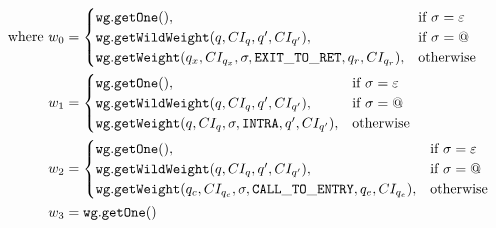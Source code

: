 \begin{align*}
\text{where }
w_0 & = \begin{cases}
        \mathtt{wg.getOne}(), & \text{if } \sigma = \varepsilon \\
        \mathtt{wg.getWildWeight}(q,CI_q,q',CI_{q'}), & \text{if } \sigma = \text{\ensuremath{@}} \\
        \mathtt{wg.getWeight}(q_x,CI_{q_x},\sigma,\mathtt{EXIT\_TO\_RET},q_r,CI_{q_r}), & \text{otherwise}
      \end{cases}  \\
w_1 &= \begin{cases}
         \mathtt{wg.getOne}(), & \text{if } \sigma = \varepsilon \\
         \mathtt{wg.getWildWeight}(q,CI_q,q',CI_{q'}), & \text{if } \sigma = \text{\ensuremath{@}} \\
         \mathtt{wg.getWeight}(q,CI_q,\sigma,\mathtt{INTRA},q',CI_{q'}), & \text{otherwise}
      \end{cases} \\
w_2 &= \begin{cases}
         \mathtt{wg.getOne}(), & \text{if } \sigma = \varepsilon \\
         \mathtt{wg.getWildWeight}(q,CI_q,q',CI_{q'}), & \text{if } \sigma = \text{\ensuremath{@}} \\
         \mathtt{wg.getWeight}(q_c,CI_{q_c},\sigma,\mathtt{CALL\_TO\_ENTRY},q_e,CI_{q_e}), & \text{otherwise}
      \end{cases} \\
w_3 &= \mathtt{wg.getOne}() 
\end{align*}


